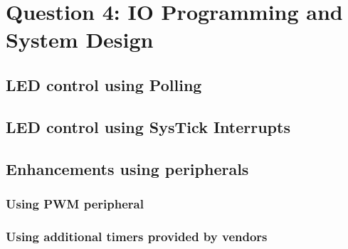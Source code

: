 \section*{Question 4: \small{IO Programming and System Design}}

\subsection*{LED control using Polling}



\clearpage
\subsection*{LED control using SysTick Interrupts}



\clearpage
\subsection*{Enhancements using peripherals}

\subsubsection*{Using PWM peripheral}



\clearpage
\subsubsection*{Using additional timers provided by vendors}


